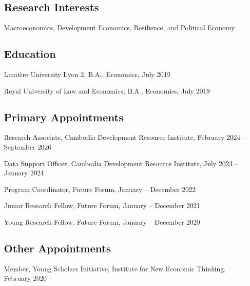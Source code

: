 \documentclass[10pt,a4paper]{article}
\begin{document}
\subsection*{Research Interests}	

Macroeconomics, Development Economics, Resilience, and Political Economy

\subsection*{Education}
	
	Lumière University Lyon 2, B.A., Economics, July 2019
	
	Royal University of Law and Economics, B.A., Economics, July 2019 
	

\subsection*{Primary Appointments}	

		Research Associate, Cambodia Development Resource Institute,  February 2024 -- September 2026
		
		Data Support Officer, Cambodia Development Resource Institute, July 2023 -- January 2024
		
		Program Coordinator, Future Forum, January -- December 2022
		
		Junior Research Fellow, Future Forum, January -- December 2021
		
		Young Research Fellow, Future Forum, January -- December 2020

\subsection*{Other Appointments}
	
	Member, Young Scholars Initiative, Institute for New Economic Thinking, February 2020 --
\end{document}
